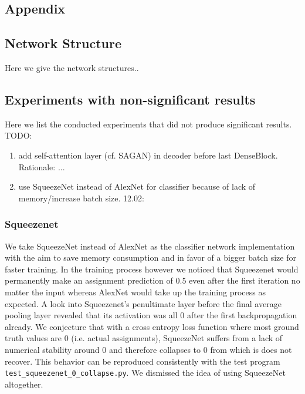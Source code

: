 \documentclass[12pt,a4paper]{article}
\begin{document}
\begin{appendices}
\section{Appendix}
\subsection{Network Structure}
Here we give the network structures..

\subsection{Experiments with non-significant results}
Here we list the conducted experiments that did not produce significant results. TODO:
\begin{enumerate}
  \item add self-attention layer (cf. SAGAN) in decoder before last DenseBlock. Rationale: ...
  \item use SqueezeNet instead of AlexNet for classifier because of lack of memory/increase batch size. 12.02: 
\end{enumerate}

\subsubsection{Squeezenet}
We take SqueezeNet instead of AlexNet as the classifier network implementation with the aim to save memory consumption and in favor of a bigger batch size for faster training. In the training process however we noticed that Squeezenet would permanently make an assignment prediction of 0.5 even after the first iteration no matter the input whereas AlexNet would take up the training process as expected. A look into Squeezenet's penultimate layer before the final average pooling layer revealed that its activation was all 0 after the first backpropagation already. We conjecture that with a cross entropy loss function where most ground truth values are 0 (i.e. actual assignments), SqueezeNet suffers from a lack of numerical stability around 0 and therefore collapses to 0 from which is does not recover. This behavior can be reproduced consistently with the test program \texttt{test\_squeezenet\_0\_collapse.py}. We dismissed the idea of using SqueezeNet altogether.


\end{appendices}
\end{document}

